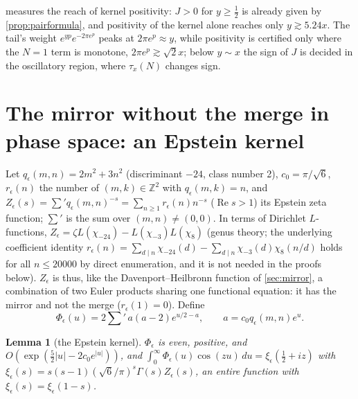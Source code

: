 \documentclass[11pt]{article}
\newtheorem{lemma}[theorem]{Lemma}
\theoremstyle{definition}\newtheorem{definition}[theorem]{Definition}
\theoremstyle{remark}\newtheorem{remark}[theorem]{Remark}
\renewcommand{\Re}{\operatorname{Re}}\renewcommand{\Im}{\operatorname{Im}}
\begin{document}
 measures the reach of kernel positivity: $J>0$ for $y\ge\frac12$ is already given by \cref{prop:pairformula}, and positivity of the kernel alone reaches only $y\gtrsim5.24x$. The tail's weight $e^{yp}e^{-2\pi e^p}$ peaks at $2\pi e^p\approx y$, while positivity is certified only where the $N=1$ term is monotone, $2\pi e^p\gtrsim\sqrt2x$; below $y\sim x$ the sign of $J$ is decided in the oscillatory region, where $\tau_x(N)$ changes sign.

\section{The mirror without the merge in phase space: an Epstein kernel}\label{sec:epstein}

Let $q_\epsilon(m,n)=2m^2+3n^2$ (discriminant $-24$, class number 2), $c_0=\pi/\sqrt6$, $r_\epsilon(n)$ the number of $(m,k)\in\mathbb Z^2$ with $q_\epsilon(m,k)=n$, and $Z_\epsilon(s)=\sum'q_\epsilon(m,n)^{-s}=\sum_{n\ge1}r_\epsilon(n)n^{-s}$ ($\Re s>1$) its Epstein zeta function; $\sum'$ is the sum over $(m,n)\ne(0,0)$. In terms of Dirichlet $L$-functions, $Z_\epsilon=\zeta L(\chi_{-24})-L(\chi_{-3})L(\chi_8)$ (genus theory; the underlying coefficient identity $r_\epsilon(n)=\sum_{d\mid n}\chi_{-24}(d)-\sum_{d\mid n}\chi_{-3}(d)\chi_8(n/d)$ holds for all $n\le20000$ by direct enumeration, and it is not needed in the proofs below). $Z_\epsilon$ is thus, like the Davenport--Heilbronn function of \cref{sec:mirror}, a combination of two Euler products sharing one functional equation: it has the mirror and not the merge ($r_\epsilon(1)=0$). Define
\[
\Phi_\epsilon(u)=2\sum{}'\,a(a-2)e^{u/2-a},\qquad a=c_0q_\epsilon(m,n)e^u .
\]
\begin{lemma}[the Epstein kernel]\label{lem:epkernel}
$\Phi_\epsilon$ is even, positive, and $O(\exp(\frac52|u|-2c_0e^{|u|}))$, and $\int_0^\infty\Phi_\epsilon(u)\cos(zu)\,du=\xi_\epsilon(\frac12+iz)$ with $\xi_\epsilon(s)=s(s-1)(\sqrt6/\pi)^s\Gamma(s)Z_\epsilon(s)$, an entire function with $\xi_\epsilon(s)=\xi_\epsilon(1-s)$.
\end{lemma}
\end{document}
